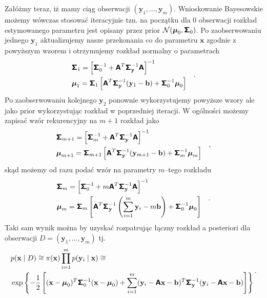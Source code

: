 \documentclass{myclass}
\begin{document}
Załóżmy teraz, iż mamy ciąg obserwacji \((\mathbf{y}_1, \ldots, \mathbf{y}_m)\). Wnioskowanie
Bayesowskie możemy wówczas stosować iteracyjnie tzn. na początku dla 0 obserwacji rozkład
estymowanego parametru jest opisany przez prior \(\mathcal{N}(\boldsymbol{\mu}_0,
\boldsymbol{\mathsf{\Sigma}}_0)\). Po zaobserwowaniu jednego \(\mathbf{y}_1\) aktualizujemy nasze przekonania co do
parametru \(\mathbf{x}\) zgodnie z powyższym wzorem i otrzymujemy rozkład normalny o parametrach
\begin{equation*}
    \begin{split}
        &\boldsymbol{\mathsf{\Sigma}}_1 = \left[\boldsymbol{\mathsf{\Sigma}}_0^{-1} + \boldsymbol{\mathsf{A}}^T\boldsymbol{\mathsf{\Sigma}}_\mathbf{y}^{-1}\boldsymbol{\mathsf{A}}\right]^{-1}\\
        &\boldsymbol{\mu}_1 = \boldsymbol{\mathsf{\Sigma}}_1\left[\boldsymbol{\mathsf{A}}^T\boldsymbol{\mathsf{\Sigma}}_\mathbf{y}^{-1}(\mathbf{y}_1 - \mathbf{b}) + \boldsymbol{\mathsf{\Sigma}}_0^{-1}\boldsymbol{\mu}_0\right]
    \end{split}\quad.
\end{equation*}
Po zaobserwowaniu kolejnego \(\mathbf{y}_2\) ponownie wykorzystujemy powyższe wzory ale jako prior
wykorzystując rozkład w poprzedniej iteracji. W ogólności możemy zapisać wzór rekurencyjny na
\(m+1\) rozkład jako
\begin{equation*}
    \begin{split}
        &\boldsymbol{\mathsf{\Sigma}}_{m+1} = \left[\boldsymbol{\mathsf{\Sigma}}_m^{-1} + \boldsymbol{\mathsf{A}}^T\boldsymbol{\mathsf{\Sigma}}_\mathbf{y}^{-1}\boldsymbol{\mathsf{A}}\right]^{-1}\\
        &\boldsymbol{\mu}_{m+1} = \boldsymbol{\mathsf{\Sigma}}_{m+1}\left[\boldsymbol{\mathsf{A}}^T\boldsymbol{\mathsf{\Sigma}}_\mathbf{y}^{-1}(\mathbf{y}_{m+1} - \mathbf{b}) + \boldsymbol{\mathsf{\Sigma}}_m^{-1}\boldsymbol{\mu}_m\right]
    \end{split}\quad,
\end{equation*}
skąd możemy od razu podać wzór na parametry \(m\)--tego rozkładu
\begin{equation*}
    \begin{split}
        &\boldsymbol{\mathsf{\Sigma}}_{m} = \left[\boldsymbol{\mathsf{\Sigma}}_0^{-1} + m\boldsymbol{\mathsf{A}}^T\boldsymbol{\mathsf{\Sigma}}_\mathbf{y}^{-1}\boldsymbol{\mathsf{A}}\right]^{-1}\\
        &\boldsymbol{\mu}_{m} = \boldsymbol{\mathsf{\Sigma}}_{m}\left[\boldsymbol{\mathsf{A}}^T\boldsymbol{\mathsf{\Sigma}}_\mathbf{y}^{-1}\left(\sum_{i=1}^{m}\mathbf{y}_{i} - m\mathbf{b}\right) + \boldsymbol{\mathsf{\Sigma}}_0^{-1}\boldsymbol{\mu}_0\right]
    \end{split}\quad.
\end{equation*}
Taki sam wynik można by uzyskać rozpatrując łączny rozkład a posteriori dla obserwacji \(D =
(\mathbf{y}_1, \ldots, \mathbf{y}_m)\) tj.
\begin{equation*}
    \begin{split}
        &p(\mathbf{x} \mid D) \cong \pi(\mathbf{x})\prod_{i=1}^m p(\mathbf{y}_i \mid \mathbf{x})\cong \\
        &\exp\left\{-\frac{1}{2}\left[(\mathbf{x}-\boldsymbol{\mu}_0)^T\boldsymbol{\mathsf{\Sigma}}_0^{-1}(\mathbf{x}-\boldsymbol{\mu}_0) + \sum_{i=1}^m(\mathbf{y}_i - \boldsymbol{\mathsf{A}}\mathbf{x}-\mathbf{b})^T\boldsymbol{\mathsf{\Sigma}}_\mathbf{y}^{-1}(\mathbf{y}_i - \boldsymbol{\mathsf{A}}\mathbf{x}-\mathbf{b})\right]\right\}
    \end{split}\,.
\end{equation*}
\end{document}
